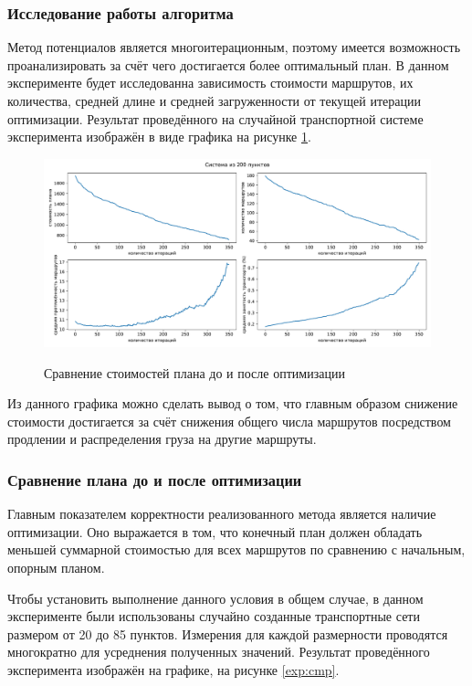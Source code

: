 \subsubsection{Исследование работы алгоритма}
Метод потенциалов является многоитерационным, поэтому имеется возможность проанализировать за счёт чего достигается более оптимальный план. В данном эксперименте будет исследованна зависимость стоимости маршрутов, их количества, средней длине и средней загруженности от текущей итерации оптимизации. Результат проведённого на случайной транспортной системе эксперимента изображён в виде графика на рисунке \ref{exp:iter}.

\begin{figure}[h!]
	\begin{center}
		{\includegraphics[scale=0.525, angle=0, page=1]{research/one_case_200.pdf}}
		\caption{Сравнение стоимостей плана до и после оптимизации}
		\label{exp:iter}
	\end{center}
\end{figure}

Из данного графика можно сделать вывод о том, что главным образом снижение стоимости достигается за счёт снижения общего числа маршрутов посредством продлении и распределения груза на другие маршруты.

\subsubsection{Сравнение плана до и после оптимизации}
Главным показателем корректности реализованного метода является наличие оптимизации. Оно выражается в том, что конечный план должен обладать меньшей суммарной стоимостью для всех маршрутов по сравнению с начальным, опорным планом. 

Чтобы установить выполнение данного условия в общем случае, в данном эксперименте были использованы случайно созданные транспортные сети размером от 20 до 85 пунктов. Измерения для каждой размерности проводятся многократно для усреднения полученных значений. Результат проведённого эксперимента изображён на графике, на рисунке \ref{exp:cmp}.

